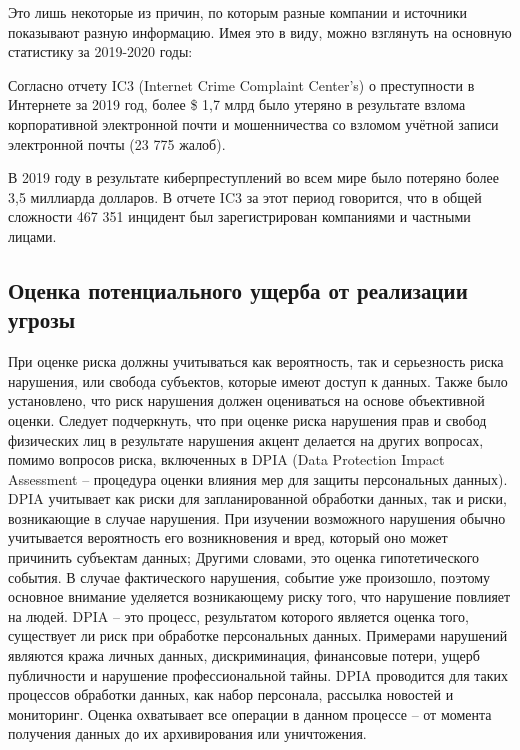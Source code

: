 Это лишь некоторые из причин, по которым разные компании и
источники показывают разную информацию. Имея это в виду, можно
взглянуть на основную статистику за 2019-2020 годы:

Согласно отчету IC3 \cite{bardaev} (Internet Crime Complaint Center’s) о
преступности в Интернете за 2019 год, более \$ 1,7 млрд было утеряно в
результате взлома корпоративной электронной почти и мошенничества со
взломом учётной записи электронной почты (23 775 жалоб).

В 2019 году в результате киберпреступлений во всем мире было
потеряно более 3,5 миллиарда долларов. В отчете IC3 за этот период
говорится, что в общей сложности 467 351 инцидент был зарегистрирован
компаниями и частными лицами.

\subsection{Оценка потенциального ущерба от реализации угрозы}
\label{subsec:problems:damage_assessment}

При оценке риска должны учитываться как вероятность, так и серьезность риска нарушения, или свобода субъектов, которые имеют доступ к данных. Также было установлено, что риск нарушения должен
оцениваться на основе объективной оценки.
Следует подчеркнуть, что при оценке риска нарушения прав и свобод
физических лиц в результате нарушения акцент делается на других вопросах,
помимо вопросов риска, включенных в DPIA (Data Protection Impact
Assessment – процедура оценки влияния мер для защиты персональных
данных). DPIA \cite{bardaev} учитывает как риски для запланированной обработки
данных, так и риски, возникающие в случае нарушения. При изучении
возможного нарушения обычно учитывается вероятность его возникновения и
вред, который оно может причинить субъектам данных; Другими словами, это
оценка гипотетического события. В случае фактического нарушения, событие
уже произошло, поэтому основное внимание уделяется возникающему риску
того, что нарушение повлияет на людей.
DPIA – это процесс, результатом которого является оценка того,
существует ли риск при обработке персональных данных. Примерами
нарушений являются кража личных данных, дискриминация, финансовые
потери, ущерб публичности и нарушение профессиональной тайны. DPIA
проводится для таких процессов обработки данных, как набор персонала,
рассылка новостей и мониторинг. Оценка охватывает все операции в данном
процессе – от момента получения данных до их архивирования или уничтожения.
